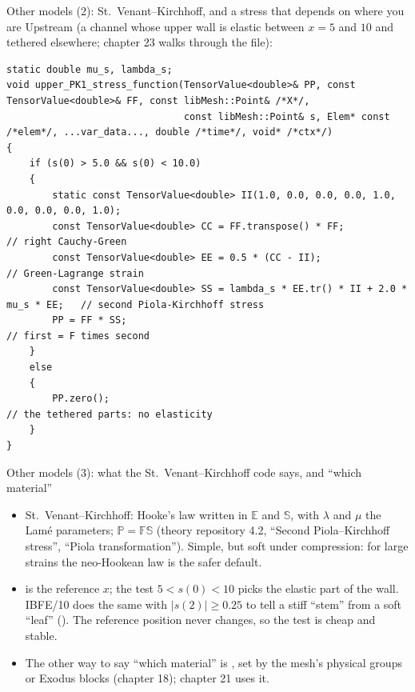 \documentclass[aspectratio=169,11pt]{beamer}
\begin{document}
\begin{frame}[fragile]{Other models (2): St.\ Venant--Kirchhoff, and a stress that depends on where you are}
\label{fr:svk}
\footnotesize
Upstream  (a channel whose upper wall is elastic between $x = 5$ and $10$ and tethered elsewhere; chapter 23 walks through the file):
\begin{lstlisting}[style=cpptiny]
static double mu_s, lambda_s;
void upper_PK1_stress_function(TensorValue<double>& PP, const TensorValue<double>& FF, const libMesh::Point& /*X*/,
                               const libMesh::Point& s, Elem* const /*elem*/, ...var_data..., double /*time*/, void* /*ctx*/)
{
    if (s(0) > 5.0 && s(0) < 10.0)
    {
        static const TensorValue<double> II(1.0, 0.0, 0.0, 0.0, 1.0, 0.0, 0.0, 0.0, 1.0);
        const TensorValue<double> CC = FF.transpose() * FF;              // right Cauchy-Green
        const TensorValue<double> EE = 0.5 * (CC - II);                   // Green-Lagrange strain
        const TensorValue<double> SS = lambda_s * EE.tr() * II + 2.0 * mu_s * EE;   // second Piola-Kirchhoff stress
        PP = FF * SS;                                                     // first = F times second
    }
    else
    {
        PP.zero();                                                        // the tethered parts: no elasticity
    }
}
\end{lstlisting}
\end{frame}

\begin{frame}{Other models (3): what the St.\ Venant--Kirchhoff code says, and ``which material''}
\label{fr:svk2}
\footnotesize
\begin{itemize}
  \item St.\ Venant--Kirchhoff: Hooke's law written in $\mathbb{E}$ and $\mathbb{S}$, with $\lambda$ and $\mu$ the Lam\'e parameters; $\mathbb{P} = \mathbb{F}\mathbb{S}$ (theory repository 4.2, ``Second Piola--Kirchhoff stress'', ``Piola transformation''). Simple, but soft under compression: for large strains the neo-Hookean law is the safer default.
  \item {}  is the reference $x$; the test $5 < s(0) < 10$ picks the elastic part of the wall. IBFE/10 does the same with $|s(2)| \ge 0.25$ to tell a stiff ``stem'' from a soft ``leaf'' (). The reference position never changes, so the test is cheap and stable.
  \item The other way to say ``which material'' is , set by the mesh's physical groups or Exodus blocks (chapter 18); chapter 21 uses it.
\end{itemize}
\end{frame}
\end{document}
